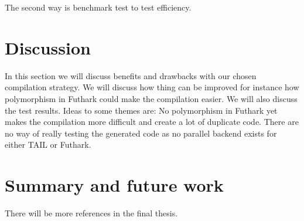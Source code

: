 \documentclass[11pt]{article}
\begin{document}
The second way is benchmark test to test efficiency. 


\section{Discussion}
In this section we will discuss benefits and drawbacks with our chosen compilation strategy.
We will discuss how thing can be improved for instance how polymorphism in Futhark could make the compilation easier.
We will also discuss the test results.
Ideas to some themes are: No polymorphism in Futhark yet makes the compilation more difficult and create a lot of duplicate code.
There are no way of really testing the generated code as no parallel backend exists for either TAIL or Futhark.

\section{Summary and future work}




{}


There will be more references in the final thesis. 
\end{document}
